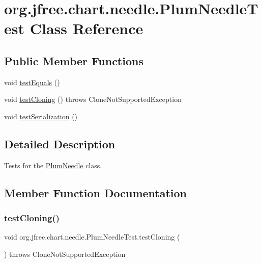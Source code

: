 \hypertarget{classorg_1_1jfree_1_1chart_1_1needle_1_1_plum_needle_test}{}\section{org.\+jfree.\+chart.\+needle.\+Plum\+Needle\+Test Class Reference}
\label{classorg_1_1jfree_1_1chart_1_1needle_1_1_plum_needle_test}
\subsection*{Public Member Functions}
\begin{DoxyCompactItemize}
\item 
void \mbox{\hyperlink{classorg_1_1jfree_1_1chart_1_1needle_1_1_plum_needle_test_a5093b788a00ddc088d93e57c560089fc}{test\+Equals}} ()
\item 
void \mbox{\hyperlink{classorg_1_1jfree_1_1chart_1_1needle_1_1_plum_needle_test_a4abea201e3118d2178079977df60d603}{test\+Cloning}} ()  throws Clone\+Not\+Supported\+Exception 
\item 
void \mbox{\hyperlink{classorg_1_1jfree_1_1chart_1_1needle_1_1_plum_needle_test_af8eb727a581d3d362d5c50b2879d3006}{test\+Serialization}} ()
\end{DoxyCompactItemize}


\subsection{Detailed Description}
Tests for the \mbox{\hyperlink{classorg_1_1jfree_1_1chart_1_1needle_1_1_plum_needle}{Plum\+Needle}} class. 

\subsection{Member Function Documentation}
\mbox{\label{classorg_1_1jfree_1_1chart_1_1needle_1_1_plum_needle_test_a4abea201e3118d2178079977df60d603}} 
\subsubsection{\texorpdfstring{test\+Cloning()}{testCloning()}}
{\footnotesize\ttfamily void org.\+jfree.\+chart.\+needle.\+Plum\+Needle\+Test.\+test\+Cloning (\begin{DoxyParamCaption}{ }\end{DoxyParamCaption}) throws Clone\+Not\+Supported\+Exception}

